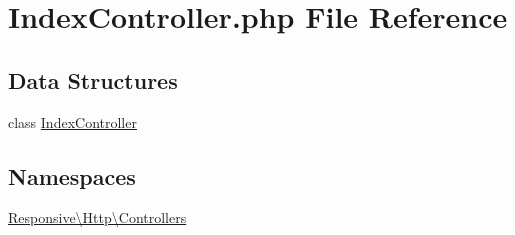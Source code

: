 \hypertarget{_index_controller_8php}{}\section{Index\+Controller.\+php File Reference}
\label{_index_controller_8php}
\subsection*{Data Structures}
\begin{DoxyCompactItemize}
\item 
class \mbox{\hyperlink{class_responsive_1_1_http_1_1_controllers_1_1_index_controller}{Index\+Controller}}
\end{DoxyCompactItemize}
\subsection*{Namespaces}
\begin{DoxyCompactItemize}
\item 
 \mbox{\hyperlink{namespace_responsive_1_1_http_1_1_controllers}{Responsive\textbackslash{}\+Http\textbackslash{}\+Controllers}}
\end{DoxyCompactItemize}
